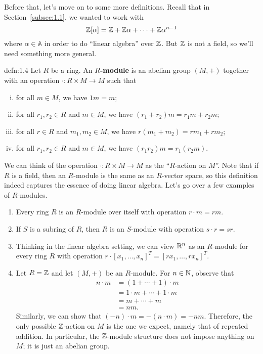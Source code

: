 Before that, let's move on to some more definitions. Recall that in 
Section~\ref{subsec:1.1}, we wanted to work with 
\[ \mathbb{Z}[\alpha] = \mathbb{Z} + \mathbb{Z}\alpha + \cdots + \mathbb{Z}\alpha^{n-1} \] 
where $\alpha \in \mathbb{A}$ in order to do ``linear algebra'' over $\mathbb{Z}$. But $\mathbb{Z}$ is not a field, 
so we'll need something more general.

\begin{defn}{defn:1.4}
    Let $R$ be a ring. An {\bf $R$-module} is an abelian group $(M, +)$ 
    together with an operation $\cdot : R \times M \to M$ such that 
    \begin{enumerate}[(i)]
        \item for all $m \in M$, we have $1m = m$; 
        \item for all $r_1, r_2 \in R$ and $m \in M$, we have 
        $(r_1 + r_2)m = r_1m + r_2m$;
        \item for all $r \in R$ and $m_1, m_2 \in M$, we have 
        $r(m_1 + m_2) = rm_1 + rm_2$; 
        \item for all $r_1, r_2 \in R$ and $m \in M$, we have 
        $(r_1r_2)m = r_1(r_2m)$.
    \end{enumerate}
\end{defn}

We can think of the operation $\cdot : R \times M \to M$ as the ``$R$-action 
on $M$''. Note that if $R$ is a field, then an $R$-module is the same as 
an $R$-vector space, so this definition indeed captures the essence of doing
linear algebra. Let's go over a few examples of $R$-modules. 
\begin{enumerate}[(1)]
    \item Every ring $R$ is an $R$-module over itself with operation 
    $r \cdot m = rm$.
    \item If $S$ is a subring of $R$, then $R$ is an $S$-module with 
    operation $s \cdot r = sr$. 
    \item Thinking in the linear algebra setting, we can view $\mathbb{R}^n$ as an 
    $R$-module for every ring $R$ with operation $r \cdot [x_1, \dots, x_n]^T 
    = [rx_1, \dots, rx_n]^T$. 
    \item Let $R = \mathbb{Z}$ and let $(M, +)$ be an $R$-module. For $n \in \mathbb{N}$, 
    observe that 
    \begin{align*}
        n \cdot m &= (1 + \cdots + 1) \cdot m \\
        &= 1 \cdot m + \cdots + 1 \cdot m \\ 
        &= m + \cdots + m \\ 
        &= nm.
    \end{align*}
    Similarly, we can show that $(-n) \cdot m = -(n \cdot m) = -nm$. Therefore, 
    the only possible $\mathbb{Z}$-action on $M$ is the one we expect, namely that 
    of repeated addition. In particular, the $\mathbb{Z}$-module structure does not 
    impose anything on $M$; it is just an abelian group. 
\end{enumerate}


